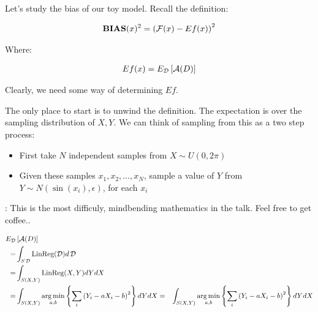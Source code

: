 %
%
\begin{frame}
  Let's study the bias of our toy model.  Recall the definition:

  \begin{align*}
    \operatorname*{\mathbf{BIAS}} (x)^2 = \left( \operatorname*{\mathcal{F}}(x) - Ef(x) \right)^2
  \end{align*}

  Where:

  \begin{align*}
    Ef(x) = E_{\operatorname*{\mathcal{D}}} \left[ \operatorname*{\mathcal{A}}(D) \right] \\ 
  \end{align*}

  Clearly, we need some way of determining $Ef$.
\end{frame}
%
%
\begin{frame}
  The only place to start is to unwind the definition.  The expectation is over
  the sampling distribution of $X, Y$.  We can think of sampling from this as a
  two step process:

  \begin{itemize}
    \item First take $N$ independent samples from $X \sim U(0, 2 \pi)$
    \item Given these samples $x_1, x_2, \ldots, x_N$, sample a value of $Y$
    from $Y \sim N(\sin(x_i), \epsilon)$, for each $x_i$
  \end{itemize}
\end{frame}
%
%
\begin{frame}
  : This is the most difficuly, mindbending
  mathematics in the talk.  Feel free to get coffee..
\end{frame}
%
%
\begin{frame}
  \begin{align*}
    E_{\operatorname*{\mathcal{D}}} & \left[ \operatorname*{\mathcal{A}}(D) \right] \\
    =& \int_{S\operatorname*{\mathcal{D}}} \operatorname*{\text{LinReg}}(\operatorname*{\mathcal{D}}) d\operatorname*{\mathcal{D}} \\
    =& \int_{S(X,Y)} \operatorname*{\text{LinReg}}(X, Y) dY dX \\
    =& \int_{S(X,Y)} \operatorname*{arg\,min}_{a,b} \left\{ \sum_i \left( Y_i - a X_i - b
    \right)^2 \right\} dY dX
    =& \int_{S(X,Y)} \operatorname*{arg\,min}_{a,b} \left\{ \sum_i \left( Y_i - a X_i - b
    \right)^2 \right\} dY dX
  \end{align*}
\end{frame}
